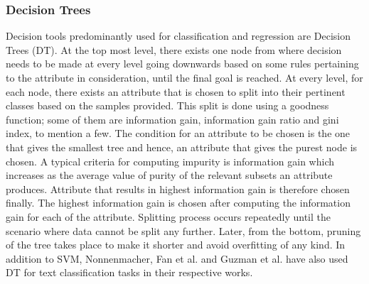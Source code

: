 \documentclass[a4paper,12pt,twoside]{report}
\begin{document}
\subsubsection{Decision Trees}
Decision tools predominantly used for classification and regression are Decision Trees (DT). At the top most level, there exists one node from where decision needs to be made at every level going downwards based on some rules pertaining to the attribute in consideration, until the final goal is reached\cite{Jain2017}. 
\newline \newline
At every level, for each node, there exists an attribute that is chosen to split into their pertinent classes based on the samples provided. This split is done using a goodness function; some of them are information gain, information gain ratio and gini index, to mention a few. The condition for an attribute to be chosen is the one that gives the smallest tree and hence, an attribute that gives the purest node is chosen. A typical criteria for computing impurity is information gain which increases as the average value of purity of the relevant subsets an attribute produces. Attribute that results in highest information gain is therefore chosen finally\cite{Jain2017}. 
\newline \newline
The highest information gain is chosen after computing the information gain for each of the attribute. Splitting process occurs repeatedly until the scenario where data cannot be split any further. Later, from the bottom, pruning of the tree takes place to make it shorter and avoid overfitting of any kind. In addition to SVM, Nonnenmacher\cite{Nonnenmacher2017}, Fan et al.\cite{Fan2017} and Guzman et al.\cite{Guzman2016} have also used DT for text classification tasks in their respective works.
\end{document}
